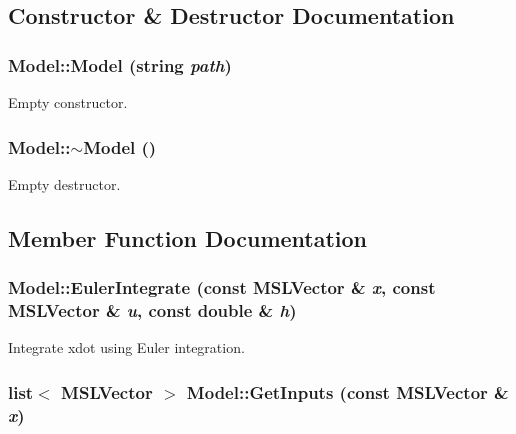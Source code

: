 \subsection{Constructor \& Destructor Documentation}
\subsubsection{\setlength{\rightskip}{0pt plus 5cm}Model::Model (string {\em path})}\label{class_Model_a0}


Empty constructor.

\subsubsection{\setlength{\rightskip}{0pt plus 5cm}Model::$\sim$Model ()\hspace{0.3cm}{\tt  [inline, virtual]}}\label{class_Model_a1}


Empty destructor.



\subsection{Member Function Documentation}
\subsubsection{ Model::Euler\-Integrate (const {\bf MSLVector} \& {\em x}, const {\bf MSLVector} \& {\em u}, const double \& {\em h})\hspace{0.3cm}{\tt  [protected]}}\label{class_Model_b1}


Integrate xdot using Euler integration.

\subsubsection{\setlength{\rightskip}{0pt plus 5cm}list$<$ {\bf MSLVector} $>$ Model::Get\-Inputs (const {\bf MSLVector} \& {\em x})\hspace{0.3cm}{\tt  [virtual]}}\label{class_Model_a2}


